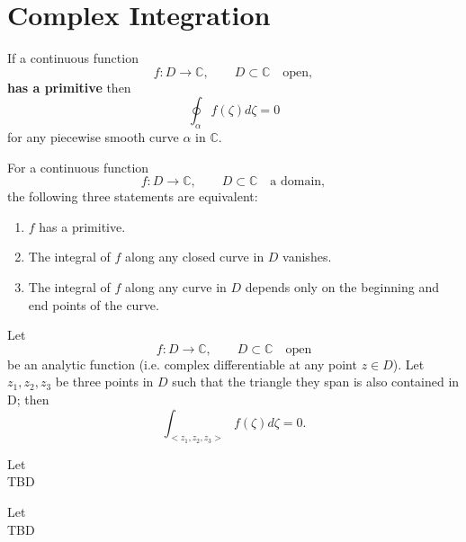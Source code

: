 \section{Complex Integration}


\begin{theorem}
    \label{sec:ClosedContourT}
    If a continuous function
    $$ f : D \rightarrow \mathbb{C}, \qquad D \subset \mathbb{C} \quad \text{open},$$
    \textbf{has a primitive} then
    $$\oint_\alpha f(\zeta)d\zeta = 0$$
    for any piecewise smooth curve $\alpha$ in $\mathbb{C}$.
\end{theorem}


\begin{theorem}
    \label{sec:MainTCalculus}
    For a continuous function
    $$ f : D \rightarrow \mathbb{C}, \qquad D \subset \mathbb{C} \quad \text{a domain},$$
    the following three statements are equivalent:
    \begin{enumerate}[label=\alph*)]
        \item $f$ has a primitive.
        \item The integral of $f$ along any closed curve in $D$ vanishes.
        \item The integral of $f$ along any curve in $D$ depends only on the beginning and end points of the curve.
    \end{enumerate}
\end{theorem}


\begin{theorem}
    \label{sec:CauchyITT}
    Let
    $$ f : D \rightarrow \mathbb{C}, \qquad D \subset \mathbb{C} \quad \text{open}$$
    be an analytic function (i.e. complex differentiable at any point $z \in D$). Let $z_1, z_2, z_3$ be three points
    in $D$ such that the triangle they span is also contained in D; then
    $$\int_{<z_1,z_2,z_3>} f(\zeta)d\zeta = 0.$$
\end{theorem}


\begin{theorem}
    \label{sec:CauchyITR}
    Let \\
    TBD
\end{theorem}


\begin{theorem}
    \label{sec:BranchLog}
    Let \\
    TBD
\end{theorem}


